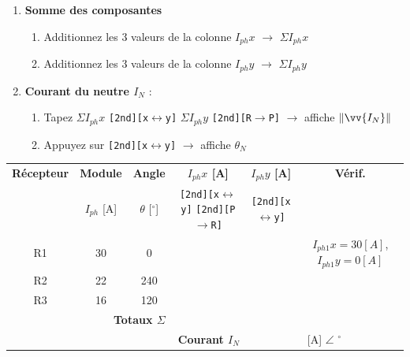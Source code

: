 \documentclass[a4paper,11pt,answers,addpoints]{exam}
\begin{document}
\begin{questions}
\begin{parts}
\begin{enumerate}[label=\textbf{\arabic*.}, leftmargin=*]
		

		
		\item \textbf{Somme des composantes}
		\begin{enumerate}
			\item Additionnez les 3 valeurs de la colonne $I_{ph}x$ $\rightarrow$ $\Sigma I_{ph}x$
			\item Additionnez les 3 valeurs de la colonne $I_{ph}y$ $\rightarrow$ $\Sigma I_{ph}y$
		\end{enumerate}
		
		\item \textbf{Courant du neutre $I_N$} :
		\begin{enumerate}
			\item Tapez \texttt{$\Sigma I_{ph}x$} \texttt{[2nd]}\texttt{[x$\leftrightarrow$y]} \texttt{$\Sigma I_{ph}y$} \texttt{[2nd]}\texttt{[R$\to$P]} $\rightarrow$ affiche $\|\vv{I_N}\|$
			\item Appuyez sur \texttt{[2nd]}\texttt{[x$\leftrightarrow$y]} $\rightarrow$ affiche $\theta_N$
		\end{enumerate}
	\end{enumerate}
	
	\begin{table}[htbp]
		\centering
		\renewcommand{\arraystretch}{1.8}
		\begin{tabular}{cccccc}
			\toprule
			\textbf{Récepteur} & \textbf{Module} & \textbf{Angle} & \textbf{$I_{ph}x$ [A]} & \textbf{$I_{ph}y$ [A]} & \textbf{Vérif.} \\
			& $I_{ph}$ [A] & $\theta$ [$^\circ$] & \texttt{[2nd]}\texttt{[x$\leftrightarrow$y]} \texttt{[2nd][P$\to$R]} & \texttt{[2nd]}\texttt{[x$\leftrightarrow$y]} & \\
			\midrule
			R1 & 30 & 0 &  &  & $I_{ph1}x=30[A]$, $I_{ph1}y=0[A]$ \\
			\midrule
			R2 & 22 & 240 & &  & \\
			\midrule
			R3 & 16 & 120 &  &  & \\
			\midrule
			\multicolumn{3}{r}{\textbf{Totaux $\Sigma$}} &  &  & \\
			\midrule
			\multicolumn{4}{r}{\textbf{Courant $I_N$}} & \multicolumn{2}{c}{\hspace{0.6cm} [A] $\angle$ \hspace{1.7cm}$^\circ$} \\
			\bottomrule
		\end{tabular}
	\end{table}
	

\end{parts}
\end{questions}
\end{document}

